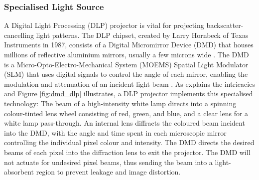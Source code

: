 \subsubsection{Specialised Light Source}
A Digital Light Processing (DLP) projector is vital for projecting backscatter-cancelling light patterns. The DLP chipset, created by Larry Hornbeck of Texas Instruments in 1987, consists of a Digital Micromirror Device (DMD) that houses millions of reflective aluminium mirrors, usually a few microns wide \cite{DigitalLightProcessing2024, HowDoesDLP}. The DMD is a Micro-Opto-Electro-Mechanical System (MOEMS) Spatial Light Modulator (SLM) that uses digital signals to control the angle of each mirror, enabling the modulation and attenuation of an incident light beam \cite{DLP4500DigitalMicromirror}. As \cite{HowDLPProjector} explains the intricacies and Figure \ref{fig:dmd_dlp} illustrates, a DLP projector implements this specialised technology: The beam of a high-intensity white lamp directs into a spinning colour-tinted lens wheel consisting of red, green, and blue, and a clear lens for a white lamp pass-through. An internal lens diffracts the coloured beam incident into the DMD, with the angle and time spent in each microscopic mirror controlling the individual pixel colour and intensity. The DMD directs the desired beams of each pixel into the diffraction lens to exit the projector. The DMD will not actuate for undesired pixel beams, thus sending the beam into a light-absorbent region to prevent leakage and image distortion.

